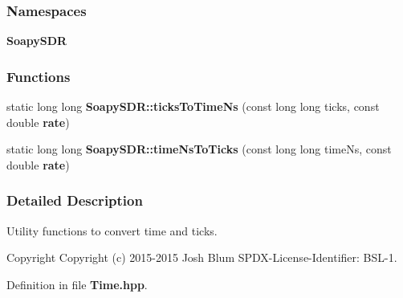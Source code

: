 \subsubsection*{Namespaces}
\begin{DoxyCompactItemize}
\item 
 {\bf Soapy\+S\+DR}
\end{DoxyCompactItemize}
\subsubsection*{Functions}
\begin{DoxyCompactItemize}
\item 
static long long {\bf Soapy\+S\+D\+R\+::ticks\+To\+Time\+Ns} (const long long ticks, const double {\bf rate})
\item 
static long long {\bf Soapy\+S\+D\+R\+::time\+Ns\+To\+Ticks} (const long long time\+Ns, const double {\bf rate})
\end{DoxyCompactItemize}


\subsubsection{Detailed Description}
Utility functions to convert time and ticks. 

\begin{DoxyCopyright}{Copyright}
Copyright (c) 2015-\/2015 Josh Blum S\+P\+D\+X-\/\+License-\/\+Identifier\+: B\+S\+L-\/1. 
\end{DoxyCopyright}


Definition in file {\bf Time.\+hpp}.


